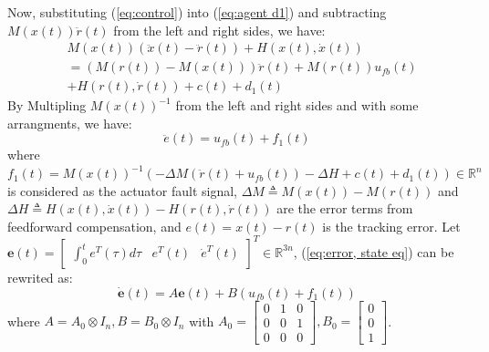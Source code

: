 \documentclass{ieeeaccess}
\newtheorem{remark}{Remark}
\begin{document}
Now, substituting (\ref{eq:control}) into (\ref{eq:agent d1}) and subtracting $M(x(t))\ddot{r}(t)$ from the left and right sides, we have:
\begin{equation} \label{eq:agent1}
    \begin{split}
        & M(x(t))(\ddot{x}(t)-\ddot{r}(t)) + H(x(t),\dot{x}(t)) \\
        & =(M(r(t))-M(x(t)))\ddot{r}(t) + M(r(t))u_{fb}(t) \\
        & + H(r(t),\dot{r}(t)) + c(t) + d_1(t)
    \end{split}
\end{equation}
By Multipling $M(x(t))^{-1}$ from the left and right sides and with some arrangments, we have:
\begin{equation} \label{eq:error, state eq}
    \ddot{e}(t) = u_{fb}(t) + f_1(t)
\end{equation}
where $f_1(t) = M(x(t))^{-1}(-\Delta M (\ddot{r}(t)+u_{fb}(t)) -\Delta H + c(t) + d_1(t))\in\mathbb{R}^n$ is considered as the actuator fault signal, $\Delta M \triangleq M(x(t)) - M(r(t))$ and $ \Delta H \triangleq H(x(t),\dot{x}(t)) - H(r(t),\dot{r}(t))$ are the error terms from feedforward compensation, and $e(t)= x(t)-r(t)$ is the tracking error.
Let $\pmb{e}(t)=\begin{bmatrix}
    \int_{0}^{t}e^T(\tau)d\tau & e^T(t) & \dot{e}^T(t)
\end{bmatrix}^T\in\mathbb{R}^{3n}$, (\ref{eq:error, state eq}) can be rewrited as:
\begin{equation} \label{eq:linear f1}
    \dot{\pmb{e}}(t)=A\pmb{e}(t)+B(u_{fb}(t)+f_1(t))
\end{equation}
where $ A = A_0\otimes I_n, B = B_0\otimes I_n$
with $A_0 = \begin{bmatrix}
    0 & 1 & 0 \\ 0 & 0 & 1 \\ 0 & 0 & 0
\end{bmatrix}, B_0 = \begin{bmatrix}
0 \\ 0 \\ 1
\end{bmatrix}$. 
\end{document}
